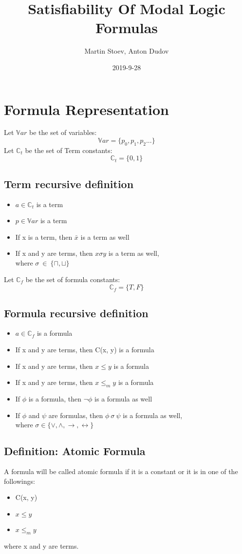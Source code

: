 \documentclass{article}
\title{Satisfiability Of Modal Logic Formulas}
\date{2019-9-28}
\author{Martin Stoev, Anton Dudov}
\begin{document}
	\maketitle
	\newpage

	\section{Formula Representation}
	Let $\mathbb{V}ar$ be the set of variables:
	\[ \mathbb{V}ar = \{p_0, p_1, p_2 ... \}\]
	Let $\mathbb{C}_t$ be the set of Term constants:
	\[ \mathbb{C}_t = \{0, 1 \}\]
	\subsection{Term recursive definition}
	\begin{itemize}
		\item $a \in \mathbb{C}_t$ is a term
		\item $p \in \mathbb{V}ar$ is a term
		\item If x is a term, then $\bar{x}$ is a term as well
		\item If x and y are terms, then $x \sigma y $ is a term as well,\\
			where $\sigma \: \in \: \{\sqcap, \sqcup\}$
	\end{itemize}
	Let $\mathbb{C}_f$ be the set of formula constants:
	\[ \mathbb{C}_f = \{T, F \}\]
	\subsection{Formula recursive definition}
	\begin{itemize}
		\item $a \in \mathbb{C}_f$ is a formula
		\item If x and y are terms, then C(x, y) is a formula
		\item If x and y are terms, then $x \le y$ is a formula
		\item If x and y are terms, then $x \le_m y$ is a formula
		\item If $\phi$ is a formula, then $\neg \phi$ is a formula as well
		\item If $\phi$ and $\psi$ are formulas, then $\phi \: \sigma \: \psi $ is a formula as well,\\
			where $\sigma \in \{\vee, \wedge, \rightarrow, \leftrightarrow\}$
	\end{itemize}
	
		\subsection{Definition: Atomic Formula}
			A formula will be called atomic formula if it is a constant or it is in one of the followings:
			\begin{itemize}
				\item C(x, y)
				\item $x \le y$
				\item $x \le_m y$
			\end{itemize}
			where x and y are terms.
\end{document}

